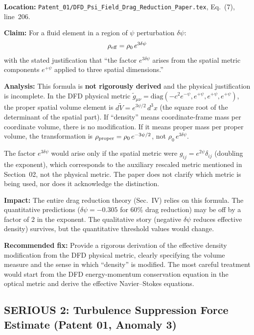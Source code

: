 \documentclass[12pt,a4paper]{article}
\begin{document}
\begin{serious}
\textbf{Location:} \texttt{Patent\_01/DFD\_Psi\_Field\_Drag\_Reduction\_Paper.tex},
Eq.~(7), line~206.

\medskip
\textbf{Claim:} For a fluid element in a region of $\psi$ perturbation
$\delta\psi$:
\[
\rho_{\rm eff} = \rho_0\,e^{3\delta\psi}
\]
with the stated justification that ``the factor $e^{3\delta\psi}$ arises from
the spatial metric components $e^{+\psi}$ applied to three spatial dimensions.''

\medskip
\textbf{Analysis:} This formula is \textbf{not rigorously derived} and the
physical justification is incomplete. In the DFD physical metric
$\tilde{g}_{\mu\nu} = \text{diag}(-c^2 e^{-\psi}, e^{+\psi}, e^{+\psi},
e^{+\psi})$, the proper spatial volume element is
$d\tilde{V} = e^{3\psi/2}\,d^3x$ (the square root of the determinant of
the spatial part). If ``density'' means coordinate-frame mass per coordinate
volume, there is no modification. If it means proper mass per proper volume,
the transformation is $\rho_{\rm proper} = \rho_0\,e^{-3\psi/2}$, not
$\rho_0\,e^{3\delta\psi}$.

The factor $e^{3\delta\psi}$ would arise only if the spatial metric were
$g_{ij} = e^{2\psi}\delta_{ij}$ (doubling the exponent), which corresponds
to the auxiliary rescaled metric mentioned in Section~02, not the physical
metric. The paper does not clarify which metric is being used, nor does it
acknowledge the distinction.

\medskip
\textbf{Impact:} The entire drag reduction theory (Sec.~IV) relies on this
formula. The quantitative predictions ($\delta\psi = -0.305$ for 60\%
drag reduction) may be off by a factor of 2 in the exponent. The qualitative
story (negative $\delta\psi$ reduces effective density) survives, but the
quantitative threshold values would change.

\medskip
\textbf{Recommended fix:} Provide a rigorous derivation of the effective
density modification from the DFD physical metric, clearly specifying the
volume measure and the sense in which ``density'' is modified. The most
careful treatment would start from the DFD energy-momentum conservation
equation in the optical metric and derive the effective Navier--Stokes
equations.
\end{serious}

\subsection{SERIOUS 2: Turbulence Suppression Force Estimate (Patent 01, Anomaly 3)}
\label{sec:ser2}
\end{document}
